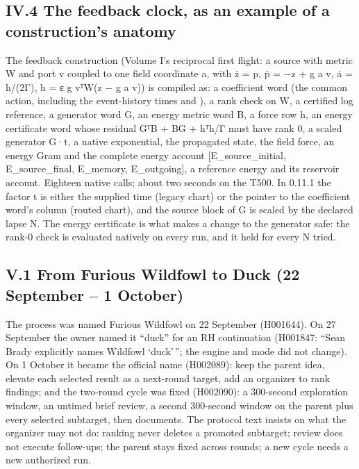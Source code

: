 \subsection{IV.4 The feedback clock, as an example of a construction's anatomy}\label{iv.4-the-feedback-clock-as-an-example-of-a-constructions-anatomy}

The feedback construction (Volume I's reciprocal first flight: a source with metric W and port v coupled to one field coordinate a, with
ż = p, ṗ = −z + g a v, ȧ = h/(2Γ), h = ε g vᵀW(z − g a v)) is compiled as: a coefficient word (the common action, including the event-history
times and ), a rank check on W, a certified log reference, a generator word G, an energy metric word B, a force row h, an energy
certificate word whose residual GᵀB + BG + hᵀh/Γ must have rank 0, a scaled generator G·t, a native exponential, the propagated state, the
field force, an energy Gram and the complete energy account {[}E\_source\_initial, E\_source\_final, E\_memory, E\_outgoing{]}, a reference energy and
its reservoir account. Eighteen native calls; about two seconds on the T500. In 0.11.1 the factor t is either the supplied time (legacy chart)
or the pointer to the coefficient word's  column (routed chart), and the source block of G is scaled by the declared lapse N. The energy
certificate is what makes a change to the generator safe: the rank-0 check is evaluated natively on every run, and it held for every N tried.

\label{the-duck-name-lineage-and-the-road-to-version-2}

\subsection{V.1 From Furious Wildfowl to Duck (22 September -- 1 October)}\label{v.1-from-furious-wildfowl-to-duck-22-september-1-october}

The process was named Furious Wildfowl on 22 September (H001644). On 27 September the owner named it ``duck'' for an RH continuation
(H001847: ``Sean Brady explicitly names Wildfowl `duck'\,''; the engine and mode did not change). On 1 October it became the official name
(H002089): keep the parent idea, elevate each selected result as a next-round target, add an organizer to rank findings; and the two-round
cycle was fixed (H002090): a 300-second exploration window, an untimed brief review, a second 300-second window on the parent plus every
selected subtarget, then documents. The protocol text insists on what the organizer may not do: ranking never deletes a promoted subtarget;
review does not execute follow-ups; the parent stays fixed across rounds; a new cycle needs a new authorized run.

